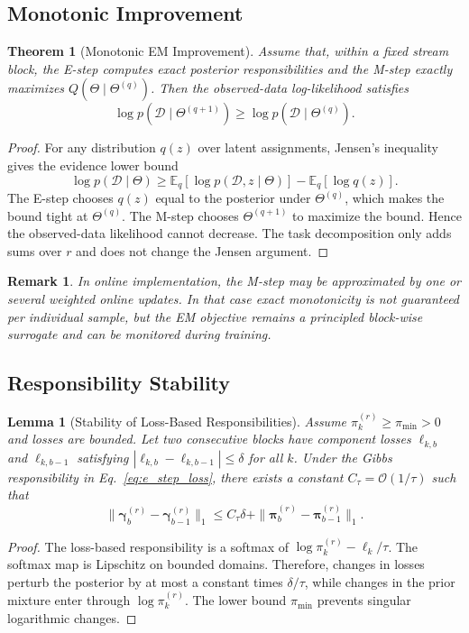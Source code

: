 ﻿\documentclass[12pt,a4paper]{article}
\newtheorem{lemma}{Lemma}
\newtheorem{theorem}{Theorem}
\newtheorem{remark}{Remark}
\newcommand{\E}{\mathbb{E}}
\newcommand{\calD}{\mathcal{D}}
\begin{document}
\subsection{Monotonic Improvement}
\begin{theorem}[Monotonic EM Improvement]
\label{thm:monotonic}
Assume that, within a fixed stream block, the E-step computes exact
posterior responsibilities and the M-step exactly maximizes
$Q(\Theta\mid\Theta^{(q)})$. Then the observed-data log-likelihood satisfies
\begin{equation}
\log p(\calD\mid\Theta^{(q+1)})\geq
\log p(\calD\mid\Theta^{(q)}).
\end{equation}
\end{theorem}
\begin{proof}
For any distribution $q(z)$ over latent assignments, Jensen's inequality
gives the evidence lower bound
\begin{equation}
\log p(\calD\mid\Theta)
\geq
\E_q[\log p(\calD,z\mid\Theta)]-\E_q[\log q(z)].
\end{equation}
The E-step chooses $q(z)$ equal to the posterior under $\Theta^{(q)}$, which
makes the bound tight at $\Theta^{(q)}$. The M-step chooses $\Theta^{(q+1)}$
to maximize the bound. Hence the observed-data likelihood cannot decrease.
The task decomposition only adds sums over $r$ and does not change the
Jensen argument.
\end{proof}

\begin{remark}
In online implementation, the M-step may be approximated by one or several
weighted online updates. In that case exact monotonicity is not guaranteed
per individual sample, but the EM objective remains a principled block-wise
surrogate and can be monitored during training.
\end{remark}

\subsection{Responsibility Stability}
\begin{lemma}[Stability of Loss-Based Responsibilities]
\label{lem:responsibility_stability}
Assume $\pi_k^{(r)}\geq \pi_{\min}>0$ and losses are bounded. Let two
consecutive blocks have component losses $\ell_{k,b}$ and $\ell_{k,b-1}$
satisfying $|\ell_{k,b}-\ell_{k,b-1}|\leq\delta$ for all $k$. Under the
Gibbs responsibility in Eq.~\eqref{eq:e_step_loss}, there exists a constant
$C_\tau=\mathcal{O}(1/\tau)$ such that
\begin{equation}
\|\bm{\gamma}_{b}^{(r)}-\bm{\gamma}_{b-1}^{(r)}\|_1
\leq C_\tau\delta + \|\bm{\pi}_{b}^{(r)}-\bm{\pi}_{b-1}^{(r)}\|_1.
\end{equation}
\end{lemma}
\begin{proof}
The loss-based responsibility is a softmax of
$\log\pi_k^{(r)}-\ell_k/\tau$. The softmax map is Lipschitz on bounded
domains. Therefore, changes in losses perturb the posterior by at most a
constant times $\delta/\tau$, while changes in the prior mixture enter
through $\log\pi_k^{(r)}$. The lower bound $\pi_{\min}$ prevents singular
logarithmic changes.
\end{proof}
\end{document}
